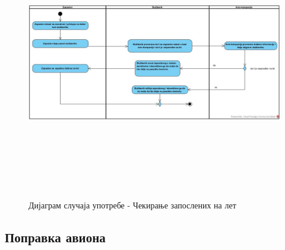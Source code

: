 \documentclass{article}
\begin{document}
\begin{figure}[H]
    \centering
    \includegraphics[width=1.1\textwidth, height=12cm]{Dijagrami_slike/cekiranje_zaposlenih.jpg}
    \caption{Дијаграм случаја употребе - Чекирање запослених на лет}
\end{figure}


\newpage
\subsection{Поправка авиона}
\end{document}
